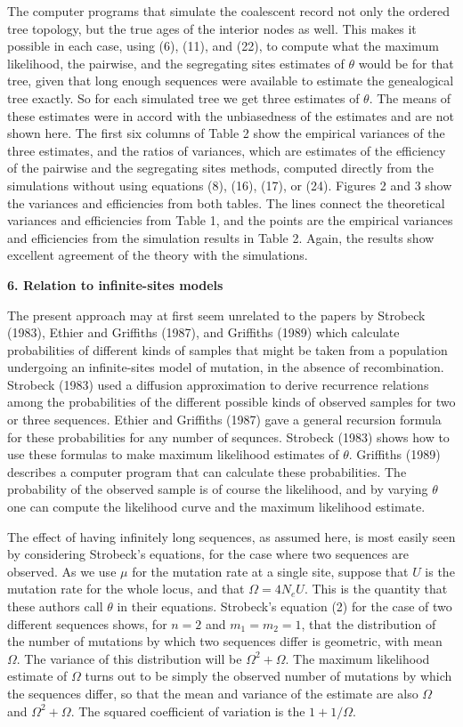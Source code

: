 The computer programs that simulate the coalescent record not only the
ordered tree topology, but the true ages of the interior nodes as well.  This
makes it possible in each case, using (6), (11), and (22), to compute what the
maximum likelihood, the pairwise, and the segregating sites estimates of $\theta$ would be for that
tree, given that long enough sequences were available to estimate the
genealogical tree exactly.  So for each simulated tree we get three estimates
of $\theta$.  The means of these estimates were in accord with the
unbiasedness of the estimates and are not shown here.  The first six columns of
Table 2 show the
empirical variances of the three estimates, and the ratios of variances,
which are estimates of the efficiency of the pairwise and the segregating sites
methods, computed
directly from the simulations without using equations (8), (16), 
(17), or (24).  Figures 2 and 3 show the variances and efficiencies from both
tables.  The
lines connect the theoretical variances and efficiencies from
Table 1, and the points are the empirical variances and efficiencies from
the simulation results in Table 2.  Again, the results show
excellent agreement of the theory with the
simulations.
\bigskip

{\bf 6. Relation to infinite-sites models}
\medskip

The present approach may at first seem unrelated to the papers by
Strobeck (1983), Ethier and Griffiths (1987), and Griffiths (1989) which
calculate probabilities of
different kinds of samples that might be taken from a population undergoing
an infinite-sites model of mutation, in the absence of recombination.
Strobeck (1983) used a diffusion approximation to derive recurrence
relations among the probabilities of the different possible kinds of
observed samples for two or three sequences.  Ethier and Griffiths (1987)
gave a general recursion formula for these probabilities for any number
of sequnces.  Strobeck (1983) shows how to use these formulas to make maximum
likelihood estimates of $\theta$.  Griffiths (1989)
describes a computer program that can calculate these probabilities.  The
probability of the observed sample is of course the likelihood, and by
varying $\theta$ one can compute the likelihood curve and the maximum
likelihood estimate.

The effect of having infinitely long sequences, as assumed here, is most
easily seen by considering Strobeck's
equations, for the case where two sequences are observed.
As we use $\mu$ for the mutation rate at a single site, suppose that
$U$ is the mutation rate for the whole locus, and that $\Omega = 4N_eU$.
This is the quantity that these authors call $\theta$ in their equations.
Strobeck's equation (2) for the case of two different sequences shows,
for $n = 2$ and $m_1 = m_2 = 1$, that the distribution of the number of
mutations by which two sequences differ is geometric, with mean
$\Omega$.  The variance of this distribution will be $\Omega^2 + \Omega$.
The maximum likelihood estimate of $\Omega$ turns out to be simply the observed
number of mutations by which the sequences differ, so that the mean and variance
of the estimate are also $\Omega$ and $\Omega^2 + \Omega$.  The squared
coefficient of variation is the $1 + 1/\Omega$.

